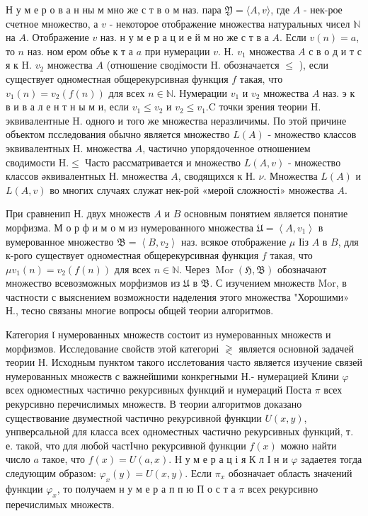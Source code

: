 \documentclass[10pt]{article}
\begin{document}
Н у м е р о в а н ны м мно же с т в о м наз. пара $\mathfrak{Y}=\langle A, v\rangle$, где $A$ - нек-рое счетное множество, а $v$ - некоторое отображение множества натуральных чисел $\mathbb{N}$ на $A$. Отображение $v$ наз. н у м е р а ц и е й м но же с т в а $A$. Если $v(n)=a$, то $n$ наз. ном ером объе к т а $a$ при нумерации $v$. Н. $v_{1}$ множества $A$ с в о д и т с я к $\mathrm{H}$. $v_{2}$ множества $A$ (отношение сводімости $\mathrm{H}$. обозначается $\leqslant$ ), если существует одноместная общерекурсивная функция $f$ такая, что $v_{1}(n)=v_{2}(f(n))$ для всех $n \in \mathbb{N}$. Нумерации $v_{1}$ и $v_{2}$ множества $A$ наз. э к в и в а л е н т н ы м и, если $v_{1} \leqslant v_{2}$ и $v_{2} \leqslant v_{1} . \mathrm{C}$ точки зрения теории $\mathrm{H}$. эквивалентные $\mathrm{H}$. одного и того же множества неразличимы. По этой причине объектом псследования обычно является множество $L(A)$ - множество классов эквивалентных $\mathrm{H}$. множества $A$, частично упорядоченное отношением сводимости $\mathrm{H} . \leqslant$ Часто рассматривается и множество $L(A, v)$ - множество классов әквивалентных Н. множества $A$, сводящихся к Н. $\nu$. Множества $L(A)$ и $L(A, v)$ во многих случаях служат нек-рой «мерой сложності» множества $A$.



При сравненип Н. двух множеств $A$ и $B$ основным понятием является понятие морфизма. М о р ф и м о м из нумерованного множества $\mathfrak{U}=\left\langle A, v_{1}\right\rangle$ в вумерованное множество $\mathfrak{B}=\left\langle B, v_{2}\right\rangle$ наз. всякое отображение $\mu$ Ііз $A$ в $B$, для к-рого существует одноместная общерекурсивная функция $f$ такая, что $\mu v_{1}(n)=v_{2}(f(n))$ для всех $n \in \mathbb{N}$. Через $\operatorname{Mor}(\mathfrak{H}, \mathfrak{B})$ обозначают множество всевозможных морфизмов из $\mathfrak{U}$ в $\mathfrak{B}$. С изучением множеств Mor, в частности с выяснением возможности наделения этого множества "Хорошими» Н., тесно связаны многие вопросы общей теории алгоритмов.



Категория $\mathfrak{l}$ нумерованных множеств состоит из нумерованных множеств и морфизмов. Исследование свойств этой категориі $\mathfrak{\gtrless}$ является основной задачей теории Н. Исходным пунктом такого исслетования часто является изучение связей нумерованных множеств с важнейшими конкрегными Н.- нумерацией Клини $\varphi$ всех одноместных частично рекурсивных функций и нумераций Поста $\pi$ всех рекурсивно перечислимых множеств. В теории алгоритмов доказано существование двуместной частично рекурсивной функции $U(x, y)$, унпверсальной для класса всех одноместных частично рекурсивных функций, т. е. такой, что для любой частІчно рекурсивной функции $f(x)$ можно найти число $a$ такое, что $f(x)=U(a, x)$. Н у м е р а ц і я К л І н и $\varphi$ задаетея тогда следующим образом: $\varphi_{x}(y)=U(x, y)$. Если $\pi_{x}$ обозначает область значений функции $\varphi_{x}$, то получаем н у м е р а п п ю П о с т а $\pi$ всех рекурсивно перечислимых множеств.
\end{document}
